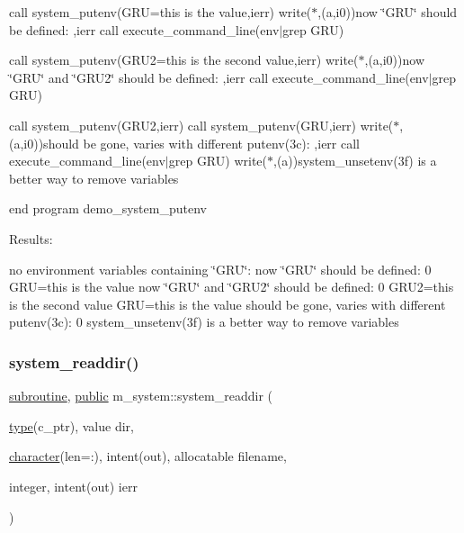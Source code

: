 call system\+\_\+putenv(\textquotesingle{}G\+RU=this is the value\textquotesingle{},ierr) write($\ast$,\textquotesingle{}(a,i0)\textquotesingle{})\textquotesingle{}now \char`\"{}\+G\+R\+U\char`\"{} should be defined\+: \textquotesingle{},ierr call execute\+\_\+command\+\_\+line(\textquotesingle{}env$\vert$grep G\+RU\textquotesingle{})

call system\+\_\+putenv(\textquotesingle{}G\+R\+U2=this is the second value\textquotesingle{},ierr) write($\ast$,\textquotesingle{}(a,i0)\textquotesingle{})\textquotesingle{}now \char`\"{}\+G\+R\+U\char`\"{} and \char`\"{}\+G\+R\+U2\char`\"{} should be defined\+: \textquotesingle{},ierr call execute\+\_\+command\+\_\+line(\textquotesingle{}env$\vert$grep G\+RU\textquotesingle{})

call system\+\_\+putenv(\textquotesingle{}G\+R\+U2\textquotesingle{},ierr) call system\+\_\+putenv(\textquotesingle{}G\+RU\textquotesingle{},ierr) write($\ast$,\textquotesingle{}(a,i0)\textquotesingle{})\textquotesingle{}should be gone, varies with different putenv(3c)\+: \textquotesingle{},ierr call execute\+\_\+command\+\_\+line(\textquotesingle{}env$\vert$grep G\+RU\textquotesingle{}) write($\ast$,\textquotesingle{}(a)\textquotesingle{})\textquotesingle{}system\+\_\+unsetenv(3f) is a better way to remove variables\textquotesingle{}

end program demo\+\_\+system\+\_\+putenv

Results\+:

no environment variables containing \char`\"{}\+G\+R\+U\char`\"{}\+: now \char`\"{}\+G\+R\+U\char`\"{} should be defined\+: 0 G\+RU=this is the value now \char`\"{}\+G\+R\+U\char`\"{} and \char`\"{}\+G\+R\+U2\char`\"{} should be defined\+: 0 G\+R\+U2=this is the second value G\+RU=this is the value should be gone, varies with different putenv(3c)\+: 0 system\+\_\+unsetenv(3f) is a better way to remove variables \mbox{\label{namespacem__system_a983df5b2d7cb5842d69c4a31829403e0}} 
\subsubsection{\texorpdfstring{system\+\_\+readdir()}{system\_readdir()}}
{\footnotesize\ttfamily \hyperlink{M__stopwatch_83_8txt_acfbcff50169d691ff02d4a123ed70482}{subroutine}, \hyperlink{M__stopwatch_83_8txt_a2f74811300c361e53b430611a7d1769f}{public} m\+\_\+system\+::system\+\_\+readdir (\begin{DoxyParamCaption}\item[{\hyperlink{stop__watch_83_8txt_a70f0ead91c32e25323c03265aa302c1c}{type}(c\+\_\+ptr), value}]{dir,  }\item[{\hyperlink{option__stopwatch_83_8txt_abd4b21fbbd175834027b5224bfe97e66}{character}(len=\+:), intent(out), allocatable}]{filename,  }\item[{integer, intent(out)}]{ierr }\end{DoxyParamCaption})}



